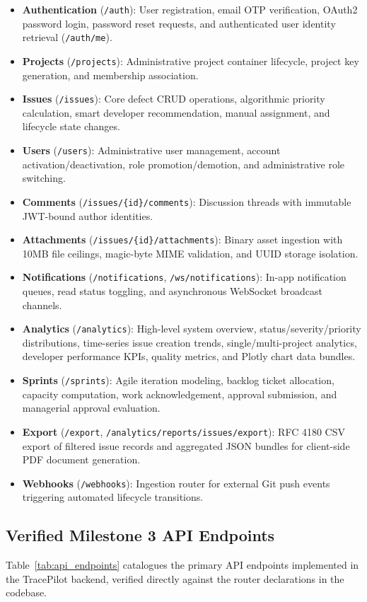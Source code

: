 \documentclass[11pt,a4paper]{article}
\begin{document}
\begin{itemize}
    \item \textbf{Authentication} (\texttt{/auth}): User registration, email OTP verification, OAuth2 password login, password reset requests, and authenticated user identity retrieval (\texttt{/auth/me}).
    \item \textbf{Projects} (\texttt{/projects}): Administrative project container lifecycle, project key generation, and membership association.
    \item \textbf{Issues} (\texttt{/issues}): Core defect CRUD operations, algorithmic priority calculation, smart developer recommendation, manual assignment, and lifecycle state changes.
    \item \textbf{Users} (\texttt{/users}): Administrative user management, account activation/deactivation, role promotion/demotion, and administrative role switching.
    \item \textbf{Comments} (\texttt{/issues/\{id\}/comments}): Discussion threads with immutable JWT-bound author identities.
    \item \textbf{Attachments} (\texttt{/issues/\{id\}/attachments}): Binary asset ingestion with 10MB file ceilings, magic-byte MIME validation, and UUID storage isolation.
    \item \textbf{Notifications} (\texttt{/notifications}, \texttt{/ws/notifications}): In-app notification queues, read status toggling, and asynchronous WebSocket broadcast channels.
    \item \textbf{Analytics} (\texttt{/analytics}): High-level system overview, status/severity/priority distributions, time-series issue creation trends, single/multi-project analytics, developer performance KPIs, quality metrics, and Plotly chart data bundles.
    \item \textbf{Sprints} (\texttt{/sprints}): Agile iteration modeling, backlog ticket allocation, capacity computation, work acknowledgement, approval submission, and managerial approval evaluation.
    \item \textbf{Export} (\texttt{/export}, \texttt{/analytics/reports/issues/export}): RFC 4180 CSV export of filtered issue records and aggregated JSON bundles for client-side PDF document generation.
    \item \textbf{Webhooks} (\texttt{/webhooks}): Ingestion router for external Git push events triggering automated lifecycle transitions.
\end{itemize}

\subsection{Verified Milestone 3 API Endpoints}
Table~\ref{tab:api_endpoints} catalogues the primary API endpoints implemented in the TracePilot backend, verified directly against the router declarations in the codebase.
\end{document}
